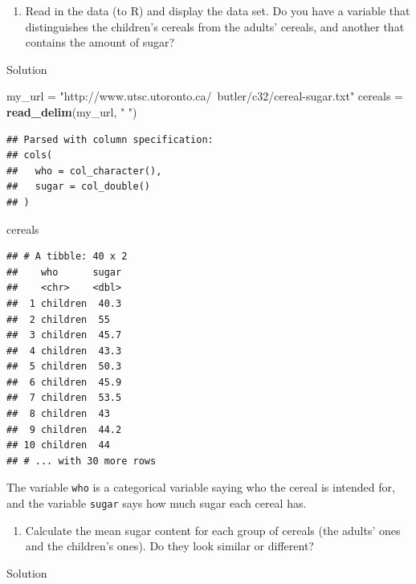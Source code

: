 \documentclass[]{tufte-book}
\newenvironment{Shaded}{}{}
\newcommand{\KeywordTok}[1]{\textcolor[rgb]{0.00,0.44,0.13}{\textbf{#1}}}
\newcommand{\NormalTok}[1]{#1}
\newcommand{\StringTok}[1]{\textcolor[rgb]{0.25,0.44,0.63}{#1}}
\providecommand{\tightlist}{%
  \setlength{\itemsep}{0pt}\setlength{\parskip}{0pt}}
\theoremstyle{definition}
\theoremstyle{definition}
\theoremstyle{definition}
\theoremstyle{remark}
\begin{document}
\begin{enumerate}
\def\labelenumi{(\alph{enumi})}
\tightlist
\item
  Read in the data (to R) and display the data set. Do you have a
  variable that distinguishes the children's cereals from the adults'
  cereals, and another that contains the amount of sugar?
\end{enumerate}

Solution

\begin{Shaded}
\begin{Highlighting}[]
\NormalTok{my_url =}\StringTok{ "http://www.utsc.utoronto.ca/~butler/c32/cereal-sugar.txt"}
\NormalTok{cereals =}\StringTok{ }\KeywordTok{read_delim}\NormalTok{(my_url, }\StringTok{" "}\NormalTok{)}
\end{Highlighting}
\end{Shaded}

\begin{verbatim}
## Parsed with column specification:
## cols(
##   who = col_character(),
##   sugar = col_double()
## )
\end{verbatim}

\begin{Shaded}
\begin{Highlighting}[]
\NormalTok{cereals}
\end{Highlighting}
\end{Shaded}

\begin{verbatim}
## # A tibble: 40 x 2
##    who      sugar
##    <chr>    <dbl>
##  1 children  40.3
##  2 children  55  
##  3 children  45.7
##  4 children  43.3
##  5 children  50.3
##  6 children  45.9
##  7 children  53.5
##  8 children  43  
##  9 children  44.2
## 10 children  44  
## # ... with 30 more rows
\end{verbatim}

The variable \texttt{who} is a categorical variable saying who the
cereal is intended for, and the variable \texttt{sugar} says how much
sugar each cereal has.

\begin{enumerate}
\def\labelenumi{(\alph{enumi})}
\setcounter{enumi}{1}
\tightlist
\item
  Calculate the mean sugar content for each group of cereals (the
  adults' ones and the children's ones). Do they look similar or
  different?
\end{enumerate}

Solution
\end{document}
